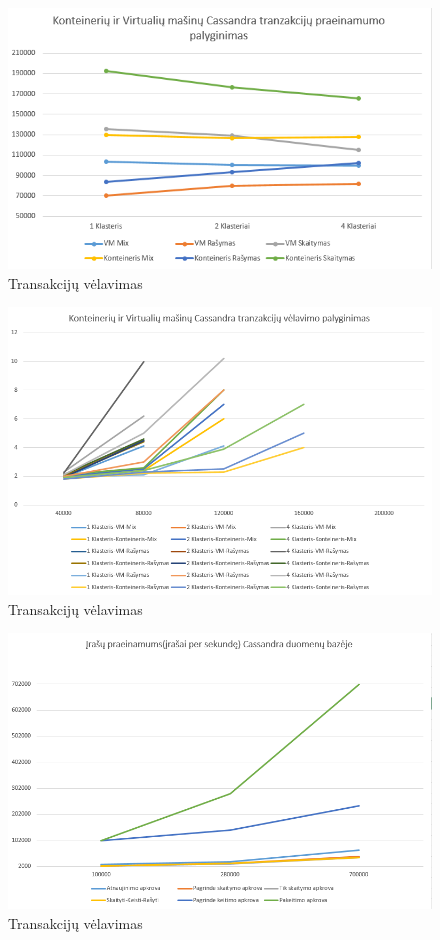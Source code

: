 \documentclass{VUMIFPSkursinis}
\begin{document}
\begin{figure}[H]
\centering
\includegraphics[scale=0.5]{img/CasTh}
\caption{Transakcijų vėlavimas} %
\label{img:mlp}
\end{figure}
\begin{figure}[H]
\centering
\includegraphics[scale=0.5]{img/CasLat}
\caption{Transakcijų vėlavimas} %
\label{img:mlp}
\end{figure}
\begin{figure}[H]
\centering
\includegraphics[scale=0.5]{img/CasTp}
\caption{Transakcijų vėlavimas} %
\label{img:mlp}
\end{figure}
\end{document}
